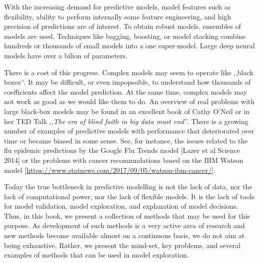 \documentclass[12pt,]{krantz}
\theoremstyle{definition}
\theoremstyle{definition}
\theoremstyle{definition}
\theoremstyle{remark}
\begin{document}
With the increasing demand for predictive models, model features such as
flexibility, ability to perform internally some feature engineering, and
high precision of predictions are of interest. To obtain robust models,
ensembles of models are used. Techniques like bagging, boosting, or
model stacking combine hundreds or thousands of small models into a one
super-model. Large deep neural models have over a bilion of parameters.

There is a cost of this progress. Complex models may seem to operate
like ,,black boxes'`. It may be difficult, or even impopssible, to
understand how thousands of coefficients affect the model prediction. At
the same time, complex models may not work as good as we would like them
to do. An overview of real problems with large black-box models may be
found in an excellent book of Cathy O'Neil \citep{ONeil} or in her TED
Talk ,,\emph{The era of blind faith in big data must end}''. There is a
growing number of examples of predictive models with performance that
deteriorated over time or became biased in some sense. See, for
instance, the issues related to the flu epidemic predictions by the
Google Flu Trends model {[}Lazer et al Science 2014{]} or the problems
with cancer recommndations based on the IBM Watson model
{[}\url{https://www.statnews.com/2017/09/05/watson-ibm-cancer/}{]}.

Today the true bottleneck in predictive modelling is not the lack of
data, nor the lack of computational power, nor the lack of flexible
models. It is the lack of tools for model validation, model exploration,
and explanation of model decisions. Thus, in this book, we present a
collection of methods that may be used for this purpose. As development
of such methods is a very active area of research and new methods become
available almost on a continuous basis, we do not aim at being
exhaustive. Rather, we present the mind-set, key problems, and several
examples of methods that can be used in model exploration.
\end{document}
